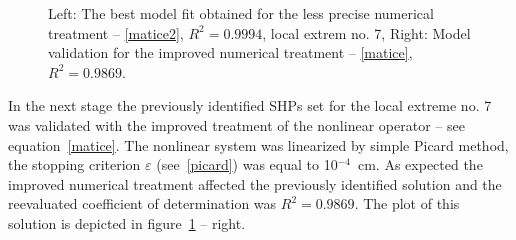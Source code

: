 \documentclass[review]{myarticle}
\begin{document}
\begin{figure}
  \hfill
  \begin{minipage}[t]{.45\textwidth}
    \begin{center}  
\end{center}
\end{minipage} 
\begin{minipage}[t]{.45\textwidth}
 \begin{center} 
\end{center}
\end{minipage}
\caption{Left: The best model fit obtained for the less precise numerical treatment -- \eqref{matice2}, $R^2= 0.9994$, local extrem no. 7, Right: Model validation for the improved numerical treatment -- \eqref{matice}, $R^2= 0.9869$. }
\label{fits}       %
\end{figure}

In the next stage the previously identified SHPs set for the local extreme no. 7  was validated with the improved treatment of the nonlinear operator -- see equation~\eqref{matice}. The nonlinear system was linearized by simple Picard method, the stopping criterion $\varepsilon$ (see~\eqref{picard}) was equal to 10$^{-4}$~cm. As expected the improved numerical treatment affected the previously identified solution and the reevaluated coefficient of determination was $R^2=0.9869$. The plot of this solution is depicted in figure~\ref{fits} -- right.
\end{document}
